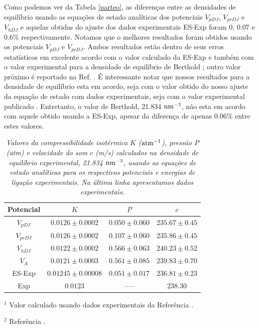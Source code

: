 \documentclass[12pt,twoside,a4paper]{report}
\begin{document}
Como podemos ver da Tabela \ref{parteo}, as diferenças
entre as
densidades de equilíbrio usando as equações de estado analíticas dos 
potenciais $V_{pDJ}$,
$V_{prDJ}$ e $V_{hDJ}$ e aquelas obtidas do ajuste dos dados experimentais 
ES-Exp foram 0, 0.07 e 0.6\% respectivamente. Notamos que o 
melhores resultados foram obtidos usando os
potenciais $V_{pDJ}$ e $V_{prDJ}$. Ambos resultados estão dentro de seus 
erros estatísticos em excelente acordo com o valor calculado da ES-Exp e também com o
valor experimental para a densidade de 
equilíbrio de
Berthold \cite{ber76}; outro valor próximo é reportado na Ref. \cite{bru87}. É
interessante notar que nossos resultados para a densidade de equilíbrio esta em
acordo, seja com o valor obtido do nosso ajuste da equação de estado com dados
experimentais, seja com o valor experimental publicado \cite{ber76}. Entretanto, o
valor de 
Berthold, 21.834 ${\rm nm^{-3}}$, não esta em acordo com aquele obtido 
usando a ES-Exp, apesar da diferença de apenas 0.06\% entre estes valores.


\begin{table}[h]
\begin{center}
\caption{\label{kpc}
{\sl Valores da compressibilidade isotérmica $K$ (${\rm atm}^{-1}$), pressão $P$ 
(atm) e velocidade
do som $c$ (m/s) calculados na densidade de equilíbrio experimental, 21.834 ${\rm
nm^{-3}}$,
usando 
as equações de estado analíticas para os respectivos
potenciais e energias de ligação experimentais. Na última linha apresentamos dados
experimentais.}}
\vspace{0.7cm}
\begin{tabular}{|cccc|}
\hline
\hline
Potencial & $K$ & $P$ & $c$ \\
\hline
$V_{pDJ}$ & $0.0126 \pm 0.0002$ & $0.050 \pm 0.060$ & $235.67 \pm 0.45$ \\
$V_{prDJ}$ & $0.0126 \pm 0.0002$ & $0.107 \pm 0.060$ & $235.86 \pm 0.45$ \\
$V_{hDJ}$ & $0.0122 \pm 0.0002$ & $0.566 \pm 0.063$ & $240.23 \pm 0.52$ \\
$V_{A}$ & $0.0121 \pm 0.0003$ & $0.561 \pm 0.085$ & $239.83 \pm 0.70$ \\
ES-Exp & $0.01245 \pm 0.00008$ & $0.051 \pm 0.017$ & $236.81 \pm 0.23$ \\
Exp & $0.0123$\footnotemark[1] & ----- & $238.30$\footnotemark[2] \\
\hline
\end{tabular}
\end{center}

$^{1}$ {\rm \small Valor calculado usando dados
experimentais da
Referência \cite{abr70}.}

$^{2}$ {\rm \small Referência \cite{abr70}.}

\vspace{9cm}
\end{table}
\end{document}
